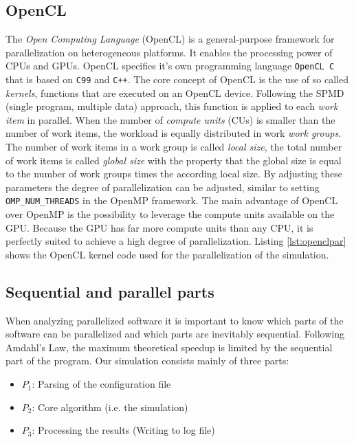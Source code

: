 \documentclass[a4paper,11pt]{scrartcl} %
\begin{document}
\subsection{OpenCL}
The \textit{Open Computing Language} (OpenCL) is a general-purpose framework for parallelization on heterogeneous platforms. It enables the processing power of CPUs and GPUs. OpenCL specifies it's own programming language \texttt{OpenCL C} that is based on \texttt{C99} and \texttt{C++}. The core concept of OpenCL is the use of so called \textit{kernels}, functions that are executed on an OpenCL device. Following the SPMD (single program, multiple data) approach, this function is applied to each \textit{work item} in parallel. When the number of \textit{compute units} (CUs) is smaller than the number of work items, the workload is equally distributed in work \textit{work groups}. The number of work items in a work group is called \textit{local size}, the total number of work items is called \textit{global size} with the property that the global size is equal to the number of work groups times the according local size. By adjusting these parameters the degree of parallelization can be adjusted, similar to setting \texttt{OMP\_NUM\_THREADS} in the OpenMP framework. The main advantage of OpenCL over OpenMP is the possibility to leverage the compute units available on the GPU. Because the GPU has far more compute units than any CPU, it is perfectly suited to achieve a high degree of parallelization. Listing \ref{lst:openclpar} shows the OpenCL kernel code used for the parallelization of the simulation.
\newpage



\subsection{Sequential and parallel parts}
When analyzing parallelized software it is important to know which parts of the software can be parallelized and which parts are inevitably sequential. Following Amdahl's Law, the maximum theoretical speedup is limited by the sequential part of the program. Our simulation consists mainly of three parts:

\begin{itemize}
  \item $P_1$: Parsing of the configuration file
  \item $P_2$: Core algorithm (i.e. the simulation)
  \item $P_3$: Processing the results (Writing to log file)
\end{itemize}
\end{document}
